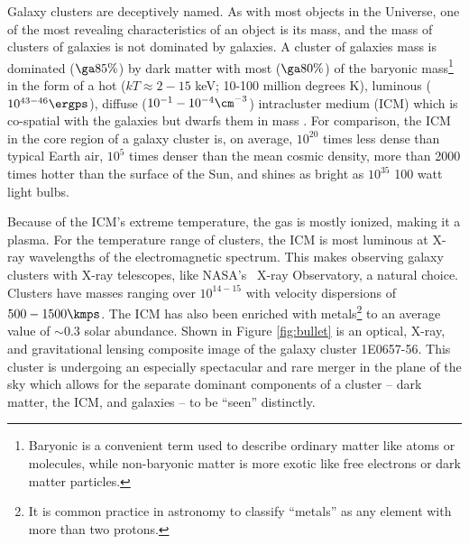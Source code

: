 Galaxy clusters are deceptively named. As with most objects in the
Universe, one of the most revealing characteristics of an object is
its mass, and the mass of clusters of galaxies is not dominated by
galaxies. A cluster of galaxies mass is dominated ($\ga 85\%$) by dark
matter with most ($\ga 80\%$) of the baryonic mass\footnote{Baryonic
is a convenient term used to describe ordinary matter like atoms or
molecules, while non-baryonic matter is more exotic like free
electrons or dark matter particles.} in the form of a hot ($kT \approx
2-15$ keV; 10-100 million degrees K), luminous ($10^{43-46} \ergps$),
diffuse ($10^{-1}-10^{-4} \cm^{-3}$) intracluster medium (ICM) which
is co-spatial with the galaxies but dwarfs them in mass
\citep{1984Natur.311..517B, 1990ApJ...356...32D}. For comparison, the
ICM in the core region of a galaxy cluster is, on average, $10^{20}$
times less dense than typical Earth air, $10^5$ times denser than the
mean cosmic density, more than 2000 times hotter than the surface of
the Sun, and shines as bright as $10^{35}$ 100 watt light bulbs.

Because of the ICM's extreme temperature, the gas is mostly ionized,
making it a plasma. For the temperature range of clusters, the ICM is
most luminous at X-ray wavelengths of the electromagnetic
spectrum. This makes observing galaxy clusters with X-ray telescopes,
like NASA's \chandra\ X-ray Observatory, a natural choice. Clusters
have masses ranging over $10^{14-15}$
 with velocity dispersions of
$500-1500 \kmps$. The ICM has also been enriched with
metals\footnote{It is common practice in astronomy to classify
``metals'' as any element with more than two protons.} to an average
value of $\sim 0.3$ solar abundance. Shown in Figure \ref{fig:bullet}
is an optical, X-ray, and gravitational lensing composite image of the
galaxy cluster 1E0657-56. This cluster is undergoing an especially
spectacular and rare merger in the plane of the sky which allows for
the separate dominant components of a cluster -- dark matter, the ICM,
and galaxies -- to be ``seen'' distinctly.

